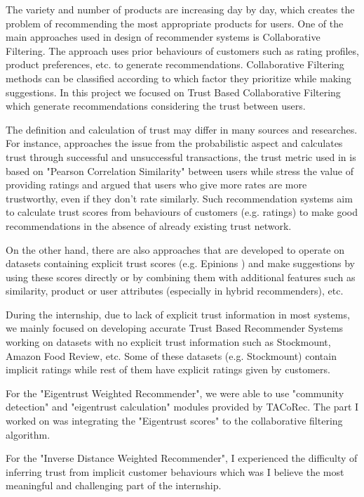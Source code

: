 The variety and number of products are increasing day by day, which creates the problem of recommending the most appropriate products for users. One of the main approaches used in design of recommender systems is Collaborative Filtering. The approach uses prior behaviours of customers such as rating profiles, product preferences, etc. to generate recommendations. Collaborative Filtering methods can be classified according to which factor they prioritize while making suggestions. In this project we focused on Trust Based Collaborative Filtering which generate recommendations considering the trust between users. 

The definition and calculation of trust may differ in many sources and researches. For instance, \cite{Eigentrust} approaches the issue from the probabilistic aspect and calculates trust through successful and unsuccessful transactions, the trust metric used in \cite{papagelis_article} is based on "Pearson Correlation Similarity" between users while \cite{lathia_article} stress the value of providing ratings and argued that users who give more rates are more trustworthy, even if they don't rate similarly. Such recommendation systems aim to calculate trust scores from behaviours of customers (e.g. ratings) to make good recommendations in the absence of already existing trust network.

On the other hand, there are also approaches\cite{massa_article} that are developed to operate on datasets containing explicit trust scores (e.g. Epinions \cite{Epinions}) and make suggestions by using these scores directly or by combining them with additional features such as similarity, product or user attributes (especially in hybrid recommenders), etc. 

During the internship, due  to  lack  of  explicit trust  information  in  most  systems, we mainly focused on developing accurate Trust Based Recommender Systems working on datasets with no explicit trust information such as Stockmount, Amazon Food Review, etc. Some of these datasets (e.g. Stockmount) contain implicit ratings while rest of them have explicit ratings given by customers.

For the "Eigentrust Weighted Recommender", we were able to use "community detection" and "eigentrust calculation" modules provided by TACoRec. The part I worked on was integrating the "Eigentrust scores" to the collaborative filtering algorithm. 

For the "Inverse Distance Weighted Recommender", I experienced the difficulty of inferring trust from implicit customer behaviours which was I believe the most meaningful and challenging part of the internship.
